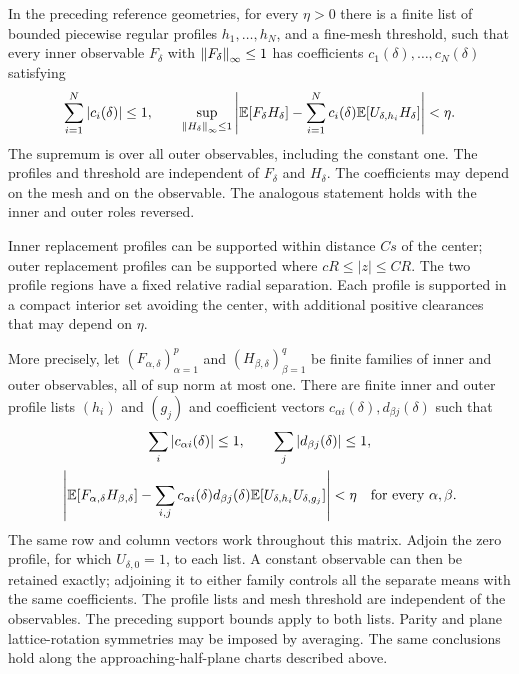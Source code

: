 \begin{lemma}
\label{buf:soft}
In the preceding reference geometries, for every $\eta>0$ there is a
finite list of bounded piecewise regular profiles $h_1,\ldots,h_N$,
and a fine-mesh threshold, such that every inner observable $F_\delta$
with $\left\|F_\delta\right\|_\infty\le1$ has coefficients
$c_1(\delta),\ldots,c_N(\delta)$ satisfying
\begin{equation}
 \sum_{i=1}^N|c_i(\delta)|\le1,
 \qquad
 \sup_{\left\|H_\delta\right\|_\infty\le1}
 \left|\mathbb E[F_\delta H_\delta]
       -\sum_{i=1}^N c_i(\delta)
                    \mathbb E[U_{\delta,h_i}H_\delta]\right|<\eta.
 \label{buf:one-side}
\end{equation}
The supremum is over all outer observables, including the constant
one.  The profiles and threshold are independent of $F_\delta$ and
$H_\delta$.  The coefficients may depend on the mesh and on the
observable.  The analogous statement holds with the inner and outer
roles reversed.

Inner replacement profiles can be supported within distance $Cs$
of the center; outer replacement profiles can be supported where
$cR\le |z|\le CR$.  The two profile regions have a fixed relative
radial separation.  Each profile is supported in a compact interior
set avoiding the center, with additional positive clearances that
may depend on $\eta$.

More precisely, let $(F_{\alpha,\delta})_{\alpha=1}^p$ and
$(H_{\beta,\delta})_{\beta=1}^q$ be finite families of inner and outer
observables, all of sup norm at most one.  There are finite inner and
outer profile lists $(h_i)$ and $(g_j)$ and coefficient vectors
$c_{\alpha i}(\delta),d_{\beta j}(\delta)$ such that
\begin{gather}
 \sum_i|c_{\alpha i}(\delta)|\le1,\qquad
 \sum_j|d_{\beta j}(\delta)|\le1,\label{buf:matrix-mass}\\
 \left|\mathbb E[F_{\alpha,\delta}H_{\beta,\delta}]
 -\sum_{i,j}c_{\alpha i}(\delta)d_{\beta j}(\delta)
       \mathbb E[U_{\delta,h_i}U_{\delta,g_j}]\right|<\eta
 \quad\text{for every }\alpha,\beta.\label{buf:two-side}
\end{gather}
The same row and column vectors work throughout this matrix.  Adjoin
the zero profile, for which $U_{\delta,0}=1$, to each list.  A constant
observable can then be retained exactly; adjoining it to either family
controls all the separate means with the same coefficients.  The
profile lists and mesh threshold are independent
of the observables.  The preceding support bounds apply to both lists.
Parity and plane lattice-rotation symmetries may be imposed by averaging.
The same conclusions hold along the approaching-half-plane charts
described above.
\end{lemma}

